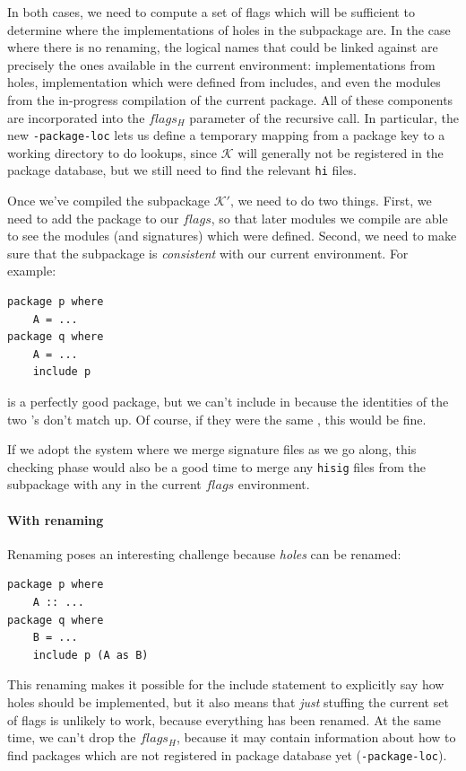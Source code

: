 \documentclass{article}
\begin{document}
In both cases, we need to compute a set of flags which will be
sufficient to determine where the implementations of holes in the
subpackage are.  In the case where there is no renaming, the logical
names that could be linked against are precisely the ones available in
the current environment: implementations from holes, implementation
which were defined from includes, and even the modules from the
in-progress compilation of the current package.  All of these components
are incorporated into the $flags_H$ parameter of the recursive call.  In
particular, the new \texttt{-package-loc} lets us define a temporary
mapping from a package key to a working directory to do lookups, since
$\mathcal{K}$ will generally not be registered in the package database,
but we still need to find the relevant \texttt{hi} files.

Once we've compiled the subpackage $\mathcal{K}'$, we need to do two things.
First, we need to add the package to our $flags$, so that later modules we
compile are able to see the modules (and signatures) which were defined.
Second, we need to make sure that the subpackage is \emph{consistent} with
our current environment.  For example:

\begin{verbatim}
package p where
    A = ...
package q where
    A = ...
    include p
\end{verbatim}

 is a perfectly good package, but we can't include in  because
the identities of the two 's don't match up.  Of course, if they were the
same , this would be fine.

If we adopt the system where we merge signature files as we go along, this checking
phase would also be a good time to merge any \texttt{hisig} files from the subpackage
with any in the current $flags$ environment.

\paragraph{With renaming}  Renaming poses an interesting challenge because \emph{holes}
can be renamed:

\begin{verbatim}
package p where
    A :: ...
package q where
    B = ...
    include p (A as B)
\end{verbatim}

This renaming makes it possible for the include statement to explicitly say how
holes should be implemented, but it also means that \emph{just} stuffing the current set of flags
is unlikely to work, because everything has been renamed.  At the same time, we can't
drop the $flags_H$, because it may contain information about how to find packages which
are not registered in package database yet (\verb|-package-loc|).
\end{document}
